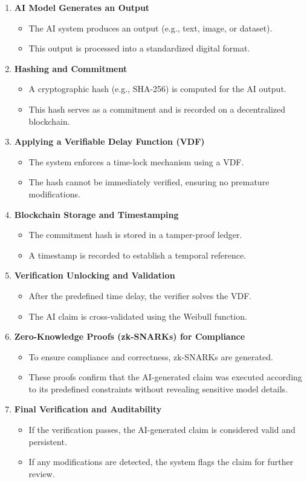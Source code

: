\documentclass[12pt]{report}
\begin{document}
\begin{enumerate}
    \item \textbf{AI Model Generates an Output}
    \begin{itemize}
        \item The AI system produces an output (e.g., text, image, or dataset).
        \item This output is processed into a standardized digital format.
    \end{itemize}
    \item \textbf{Hashing and Commitment}
    \begin{itemize}
        \item A cryptographic hash (e.g., SHA-256) is computed for the AI output.
        \item This hash serves as a commitment and is recorded on a decentralized blockchain.
    \end{itemize}
    \item \textbf{Applying a Verifiable Delay Function (VDF)}
    \begin{itemize}
        \item The system enforces a time-lock mechanism using a VDF.
        \item The hash cannot be immediately verified, ensuring no premature modifications.
    \end{itemize}
    \item \textbf{Blockchain Storage and Timestamping}
    \begin{itemize}
        \item The commitment hash is stored in a tamper-proof ledger.
        \item A timestamp is recorded to establish a temporal reference.
    \end{itemize}
    \item \textbf{Verification Unlocking and Validation}
    \begin{itemize}
        \item After the predefined time delay, the verifier solves the VDF.
        \item The AI claim is cross-validated using the Weibull function.
    \end{itemize}
    \item \textbf{Zero-Knowledge Proofs (zk-SNARKs) for Compliance}
    \begin{itemize}
        \item To ensure compliance and correctness, zk-SNARKs are generated.
        \item These proofs confirm that the AI-generated claim was executed according to its predefined constraints without revealing sensitive model details.
    \end{itemize}
    \item \textbf{Final Verification and Auditability}
    \begin{itemize}
        \item If the verification passes, the AI-generated claim is considered valid and persistent.
        \item If any modifications are detected, the system flags the claim for further review.
    \end{itemize}
\end{enumerate}
\end{document}
